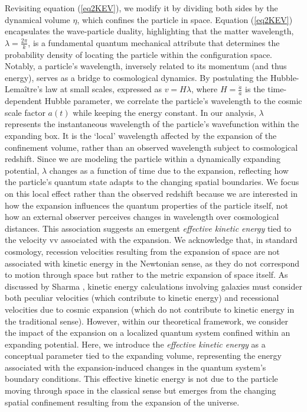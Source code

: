\documentclass[sn-mathphys-num]{sn-jnl}%
\begin{document}
Revisiting equation (\ref{eq2KEV}), we modify it by dividing both sides by the dynamical volume $\eta$, which confines the particle in space. Equation (\ref{eq2KEV}) encapsulates the wave-particle duality, highlighting that the matter wavelength, $\lambda = \frac{2 \pi}{k}$, is a fundamental quantum mechanical attribute that determines the probability density of locating the particle within the configuration space. Notably, a particle's wavelength, inversely related to its momentum (and thus energy), serves as a bridge to cosmological dynamics. By postulating the Hubble-Lemaître's law at small scales, expressed as $v = H \lambda$, where $H = \frac{\dot{a}}{a}$ is the time-dependent Hubble parameter, we correlate the particle's wavelength to the cosmic scale factor $a(t)$ while keeping the energy constant. 
In our analysis, $\lambda$ represents the instantaneous wavelength of the particle's wavefunction within the expanding box. It is the `local' wavelength affected by the expansion of the confinement volume, rather than an observed wavelength subject to cosmological redshift. Since we are modeling the particle within a dynamically expanding potential, $\lambda$ changes as a function of time due to the expansion, reflecting how the particle's quantum state adapts to the changing spatial boundaries. We focus on this local effect rather than the observed redshift  because we are interested in how the expansion influences the quantum properties of the particle itself, not how an external observer perceives changes in wavelength over cosmological distances.
This association suggests an emergent \emph{effective kinetic energy} tied to the velocity vv associated with the expansion. We acknowledge that, in standard cosmology, recession velocities resulting from the expansion of space are not associated with kinetic energy in the Newtonian sense, as they do not correspond to motion through space but rather to the metric expansion of space itself. As discussed by Sharma \cite{Sharma2024}, kinetic energy calculations involving galaxies must consider both peculiar velocities (which contribute to kinetic energy) and recessional velocities due to cosmic expansion (which do not contribute to kinetic energy in the traditional sense).
However, within our theoretical framework, we consider the impact of the expansion on a localized quantum system confined within an expanding potential. Here, we introduce the \emph{effective kinetic energy} as a conceptual parameter tied to the expanding volume, representing the energy associated with the expansion-induced changes in the quantum system's boundary conditions. This effective kinetic energy is not due to the particle moving through space in the classical sense but emerges from the changing spatial confinement resulting from the expansion of the universe.
\end{document}
